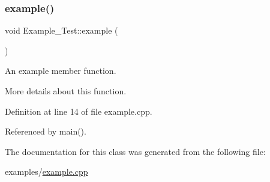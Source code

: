 \subsubsection{\texorpdfstring{example()}{example()}}
{\footnotesize\ttfamily void Example\+\_\+\+Test\+::example (\begin{DoxyParamCaption}{ }\end{DoxyParamCaption})}



An example member function. 

More details about this function. 

Definition at line 14 of file example.\+cpp.


\begin{DoxyCode}{0}

\end{DoxyCode}


Referenced by main().



The documentation for this class was generated from the following file\+:\begin{DoxyCompactItemize}
\item 
examples/\mbox{\hyperlink{example_8cpp}{example.\+cpp}}\end{DoxyCompactItemize}
